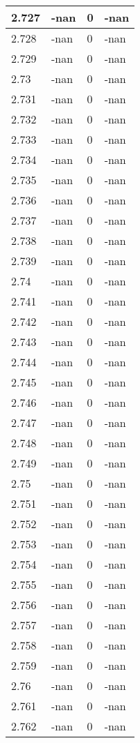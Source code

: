 \documentclass[a4paper,14pt]{extarticle}
\begin{document}
\begin{longtable}{||m{3cm}||m{3cm}|m{3cm}||m{3cm}||}
\hline
2.727 & -nan & 0 & -nan\\
\hline
2.728 & -nan & 0 & -nan\\
\hline
2.729 & -nan & 0 & -nan\\
\hline
2.73 & -nan & 0 & -nan\\
\hline
2.731 & -nan & 0 & -nan\\
\hline
2.732 & -nan & 0 & -nan\\
\hline
2.733 & -nan & 0 & -nan\\
\hline
2.734 & -nan & 0 & -nan\\
\hline
2.735 & -nan & 0 & -nan\\
\hline
2.736 & -nan & 0 & -nan\\
\hline
2.737 & -nan & 0 & -nan\\
\hline
2.738 & -nan & 0 & -nan\\
\hline
2.739 & -nan & 0 & -nan\\
\hline
2.74 & -nan & 0 & -nan\\
\hline
2.741 & -nan & 0 & -nan\\
\hline
2.742 & -nan & 0 & -nan\\
\hline
2.743 & -nan & 0 & -nan\\
\hline
2.744 & -nan & 0 & -nan\\
\hline
2.745 & -nan & 0 & -nan\\
\hline
2.746 & -nan & 0 & -nan\\
\hline
2.747 & -nan & 0 & -nan\\
\hline
2.748 & -nan & 0 & -nan\\
\hline
2.749 & -nan & 0 & -nan\\
\hline
2.75 & -nan & 0 & -nan\\
\hline
2.751 & -nan & 0 & -nan\\
\hline
2.752 & -nan & 0 & -nan\\
\hline
2.753 & -nan & 0 & -nan\\
\hline
2.754 & -nan & 0 & -nan\\
\hline
2.755 & -nan & 0 & -nan\\
\hline
2.756 & -nan & 0 & -nan\\
\hline
2.757 & -nan & 0 & -nan\\
\hline
2.758 & -nan & 0 & -nan\\
\hline
2.759 & -nan & 0 & -nan\\
\hline
2.76 & -nan & 0 & -nan\\
\hline
2.761 & -nan & 0 & -nan\\
\hline
2.762 & -nan & 0 & -nan\\

\end{longtable}
\end{document}

